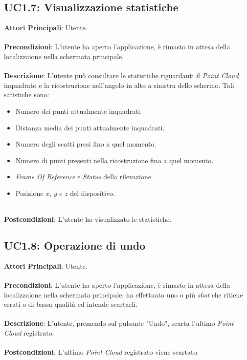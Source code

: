 \subsection{UC1.7: Visualizzazione statistiche}
\textbf{Attori Principali}: Utente.
\\\\ \textbf{Precondizioni}: L'utente ha aperto l'applicazione, è rimasto in attesa della localizzaione nella schermata principale.
\\\\ \textbf{Descrizione}: L'utente può consultare le statistiche riguardanti il \emph{Point Cloud} inquadrato e la ricostruzione nell'angolo in alto a sinistra dello schermo. Tali satistiche sono:
\begin{itemize}
	\item Numero dei punti attualmente inquadrati.
	\item Distanza media dei punti attualmente inquadrati.
	\item Numero degli scatti presi fino a quel momento.
	\item Numero di punti presenti nella ricostruzione fino a quel momento.
	\item \emph{Frame Of Reference} e \emph{Status} della rilevazione.
	\item Posizione $x$, $y$ e $z$ del dispositivo.
\end{itemize} 
\ \\ \textbf{Postcondizioni}: L'utente ha visualizzato le statistiche.

\subsection{UC1.8: Operazione di undo}
\textbf{Attori Principali}: Utente.
\\\\ \textbf{Precondizioni}: L'utente ha aperto l'applicazione, è rimasto in attesa della localizzaione nella schermata principale, ha effettuato uno o più \emph{shot} che ritiene errati o di bassa qualità ed intende scartarli.
\\\\ \textbf{Descrizione}: L'utente, premendo sul pulsante "Undo", scarta l'ultimo \emph{Point Cloud} registrato.
\\\\ \textbf{Postcondizioni}: L'ultimo \emph{Point Cloud} registrato viene scartato.




